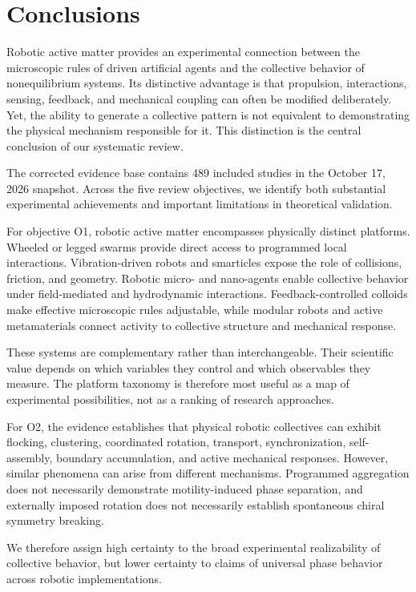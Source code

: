 \section{Conclusions}\label{sec:conclusion}

Robotic active matter provides an experimental connection
between the microscopic rules of driven artificial agents
and the collective behavior of nonequilibrium systems.
Its distinctive advantage is that propulsion, interactions,
sensing, feedback, and mechanical coupling can often be
modified deliberately. Yet, the ability to generate a
collective pattern is not equivalent to demonstrating
the physical mechanism responsible for it. This distinction
is the central conclusion of our systematic review.

The corrected evidence base contains 489 included studies
in the October 17, 2026 snapshot. Across the five review
objectives, we identify both substantial experimental
achievements and important limitations in theoretical
validation.

For objective O1, robotic active matter encompasses
physically distinct platforms. Wheeled or legged swarms
provide direct access to programmed local interactions.
Vibration-driven robots and smarticles expose the role
of collisions, friction, and geometry. Robotic micro-
and nano-agents enable collective behavior under
field-mediated and hydrodynamic interactions.
Feedback-controlled colloids make effective microscopic
rules adjustable, while modular robots and active
metamaterials connect activity to collective structure
and mechanical response.

These systems are complementary rather than interchangeable.
Their scientific value depends on which variables
they control and which observables they measure.
The platform taxonomy is therefore most useful
as a map of experimental possibilities, not
as a ranking of research approaches.

For O2, the evidence establishes that physical
robotic collectives can exhibit flocking,
clustering, coordinated rotation, transport,
synchronization, self-assembly, boundary
accumulation, and active mechanical responses.
However, similar phenomena can arise from
different mechanisms. Programmed aggregation
does not necessarily demonstrate
motility-induced phase separation, and
externally imposed rotation does not
necessarily establish spontaneous
chiral symmetry breaking.

We therefore assign high certainty to the
broad experimental realizability of
collective behavior, but lower certainty
to claims of universal phase behavior
across robotic implementations.

